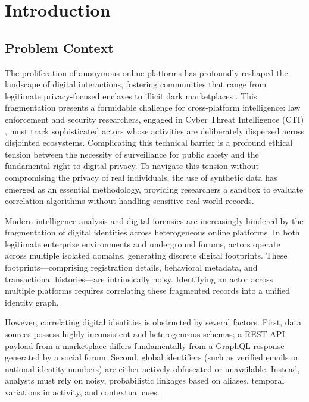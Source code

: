 \chapter{Introduction}
\label{ch:introduction}

\section{Problem Context}
\label{sec:intro-problem-context}
The proliferation of anonymous online platforms has profoundly reshaped the landscape of digital interactions, fostering communities that range from legitimate privacy-focused enclaves to illicit dark marketplaces \cite{soska2015measuring}. This fragmentation presents a formidable challenge for cross-platform intelligence: law enforcement and security researchers, engaged in Cyber Threat Intelligence (CTI) \cite{liao2016acing}, must track sophisticated actors whose activities are deliberately dispersed across disjointed ecosystems. Complicating this technical barrier is a profound ethical tension between the necessity of surveillance for public safety and the fundamental right to digital privacy. To navigate this tension without compromising the privacy of real individuals, the use of synthetic data has emerged as an essential methodology, providing researchers a sandbox to evaluate correlation algorithms without handling sensitive real-world records.

Modern intelligence analysis and digital forensics are increasingly hindered by the fragmentation of digital identities across heterogeneous online platforms. In both legitimate enterprise environments and underground forums, actors operate across multiple isolated domains, generating discrete digital footprints. These footprints—comprising registration details, behavioral metadata, and transactional histories—are intrinsically noisy. Identifying an actor across multiple platforms requires correlating these fragmented records into a unified identity graph. 

However, correlating digital identities is obstructed by several factors. First, data sources possess highly inconsistent and heterogeneous schemas; a REST API payload from a marketplace differs fundamentally from a GraphQL response generated by a social forum. Second, global identifiers (such as verified emails or national identity numbers) are either actively obfuscated or unavailable. Instead, analysts must rely on noisy, probabilistic linkages based on aliases, temporal variations in activity, and contextual cues. 


